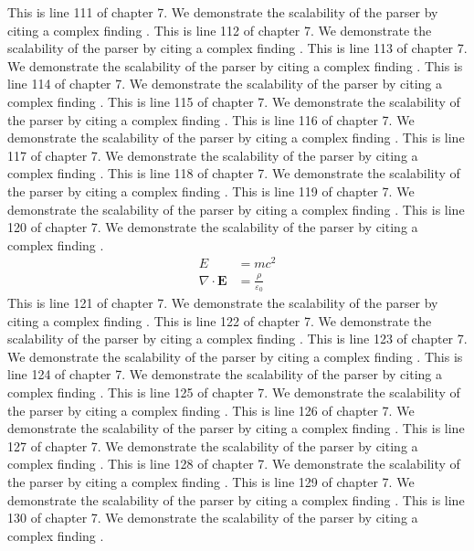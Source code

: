 This is line 111 of chapter 7. We demonstrate the scalability of the parser by citing a complex finding \cite{ref7_111}.
This is line 112 of chapter 7. We demonstrate the scalability of the parser by citing a complex finding \cite{ref7_112}.
This is line 113 of chapter 7. We demonstrate the scalability of the parser by citing a complex finding \cite{ref7_113}.
This is line 114 of chapter 7. We demonstrate the scalability of the parser by citing a complex finding \cite{ref7_114}.
This is line 115 of chapter 7. We demonstrate the scalability of the parser by citing a complex finding \cite{ref7_115}.
This is line 116 of chapter 7. We demonstrate the scalability of the parser by citing a complex finding \cite{ref7_116}.
This is line 117 of chapter 7. We demonstrate the scalability of the parser by citing a complex finding \cite{ref7_117}.
This is line 118 of chapter 7. We demonstrate the scalability of the parser by citing a complex finding \cite{ref7_118}.
This is line 119 of chapter 7. We demonstrate the scalability of the parser by citing a complex finding \cite{ref7_119}.
This is line 120 of chapter 7. We demonstrate the scalability of the parser by citing a complex finding \cite{ref7_120}.
\begin{align*}
  E &= mc^2 \\
  \nabla \cdot \mathbf{E} &= \frac{\rho}{\varepsilon_0}
\end{align*}
This is line 121 of chapter 7. We demonstrate the scalability of the parser by citing a complex finding \cite{ref7_121}.
This is line 122 of chapter 7. We demonstrate the scalability of the parser by citing a complex finding \cite{ref7_122}.
This is line 123 of chapter 7. We demonstrate the scalability of the parser by citing a complex finding \cite{ref7_123}.
This is line 124 of chapter 7. We demonstrate the scalability of the parser by citing a complex finding \cite{ref7_124}.
This is line 125 of chapter 7. We demonstrate the scalability of the parser by citing a complex finding \cite{ref7_125}.
This is line 126 of chapter 7. We demonstrate the scalability of the parser by citing a complex finding \cite{ref7_126}.
This is line 127 of chapter 7. We demonstrate the scalability of the parser by citing a complex finding \cite{ref7_127}.
This is line 128 of chapter 7. We demonstrate the scalability of the parser by citing a complex finding \cite{ref7_128}.
This is line 129 of chapter 7. We demonstrate the scalability of the parser by citing a complex finding \cite{ref7_129}.
This is line 130 of chapter 7. We demonstrate the scalability of the parser by citing a complex finding \cite{ref7_130}.
